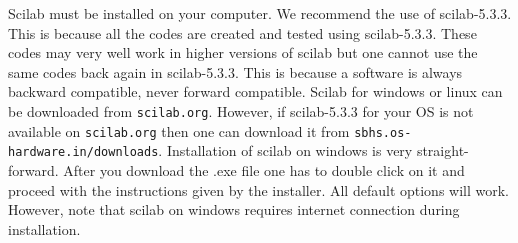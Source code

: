 
Scilab must be installed on your computer. We recommend the use of scilab-5.3.3. This is because all the codes are created and tested using scilab-5.3.3. These codes may very well work in higher versions of scilab but one cannot use the same codes back again in scilab-5.3.3. This is because a software is always backward compatible, never forward compatible. Scilab for windows or linux can be downloaded from {\tt scilab.org}. However, if scilab-5.3.3 for your OS is not available on {\tt scilab.org} then one can download it from {\tt sbhs.os-hardware.in/downloads}. Installation of scilab on windows is very straight-forward. After you download the .exe file one has to double click on it and proceed with the instructions given by the installer. All default options will work. However, note that scilab on windows requires internet connection during installation.
